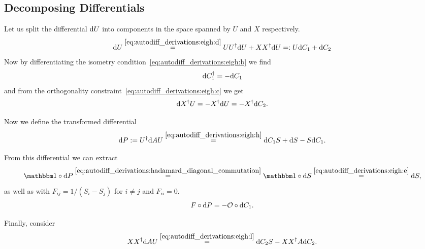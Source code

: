 \subsection{Decomposing Differentials}
Let us split the differential $\mathrm{d}{U}$ into components in the space spanned by $U$ and $X$ respectively.
\begin{equation}
    \label{eq:autodiff_derivations:eigh:f}
    \mathrm{d}{U}
    \overset{\eqref{eq:autodiff_derivations:eigh:d}}{=}
    UU^\dagger \mathrm{d}{U} + XX^\dagger \mathrm{d}{U}
    =: U \mathrm{d}{C}_1 + \mathrm{d}{C}_2
\end{equation}
Now by differentiating the isometry condition~\eqref{eq:autodiff_derivations:eigh:b} we find
\begin{equation}
    \label{eq:autodiff_derivations:eigh:h}
    \mathrm{d}{C}_1^\dagger = -\mathrm{d}{C}_1
\end{equation}
and from the orthogonality constraint~\eqref{eq:autodiff_derivations:eigh:c} we get
\begin{equation}
    \label{eq:autodiff_derivations:eigh:l}
    \mathrm{d}{X}^\dagger U = -X^\dagger\mathrm{d}{U} = -X^\dagger \mathrm{d}{C}_2
    .
\end{equation}

Now we define the transformed differential
\begin{equation}
    \label{eq:autodiff_derivations:eigh:g}
    \mathrm{d}{P}
    := U^\dagger \mathrm{d}{A} U
    \overset{\eqref{eq:autodiff_derivations:eigh:h}}{=}
    \mathrm{d}{C}_1 S + \mathrm{d}{S} - S \mathrm{d}{C}_1
    .
\end{equation}

From this differential we can extract
\begin{equation}
    \label{eq:autodiff_derivations:eigh:i}
    \eye \hadamard \dP
    \overset{\eqref{eq:autodiff_derivations:hadamard_diagonal_commutation}}{=}
    \eye \hadamard \dS
    \overset{\eqref{eq:autodiff_derivations:eigh:e}}{=}
    \dS
    ,
\end{equation}
as well as with $F_{ij} = 1 / (S_i - S_j)$ for $i \neq j$ and $F_{ii} = 0$.
\begin{equation}
    \label{eq:autodiff_derivations:eigh:j}
    F \circ \mathrm{d}{P} = -\mathcal{O} \circ \mathrm{d}{C}_1
    .
\end{equation}

Finally, consider
\begin{equation}
    \label{eq:autodiff_derivations:eigh:k}
    XX^\dagger \mathrm{d}{A} U
    \overset{\eqref{eq:autodiff_derivations:eigh:l}}{=}
    \mathrm{d}{C}_2 S - X X^\dagger A \mathrm{d}{C}_2
    .
\end{equation}

